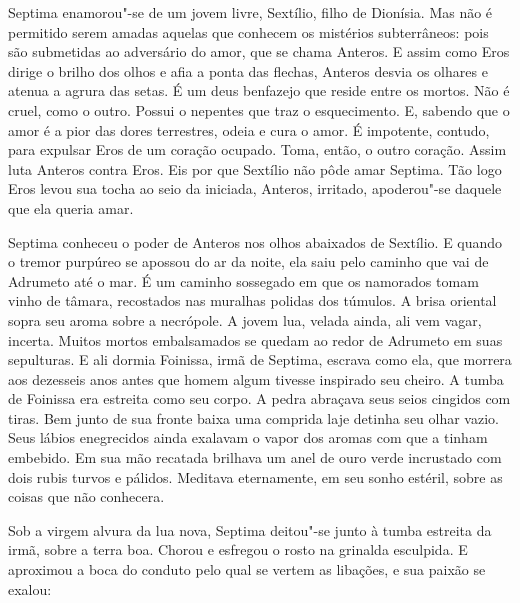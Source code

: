 Septima enamorou"-se de um jovem livre, Sextílio, filho de Dionísia. Mas não
é permitido serem amadas aquelas que conhecem os mistérios subterrâneos:
pois são submetidas ao adversário do amor, que se chama Anteros. E assim
como Eros dirige o brilho dos olhos e afia a ponta das flechas, Anteros
desvia os olhares e atenua a agrura das setas. É um deus benfazejo que
reside entre os mortos. Não é cruel, como o outro. Possui o nepentes que
traz o esquecimento. E, sabendo que o amor é a pior das dores terrestres,
odeia e cura o amor. É impotente, contudo, para expulsar Eros de um
coração ocupado. Toma, então, o outro coração. Assim luta Anteros contra
Eros. Eis por que Sextílio não pôde amar Septima. Tão logo Eros levou sua
tocha ao seio da iniciada, Anteros, irritado, apoderou"-se daquele que ela
queria amar.

Septima conheceu o poder de Anteros nos olhos abaixados de Sextílio. E
quando o tremor purpúreo se apossou do ar da noite, ela saiu pelo caminho
que vai de Adrumeto até o mar. É um caminho sossegado em que os namorados
tomam vinho de tâmara, recostados nas muralhas polidas dos túmulos. A
brisa oriental sopra seu aroma sobre a necrópole. A jovem lua, velada
ainda, ali vem vagar, incerta. Muitos mortos embalsamados se quedam ao
redor de Adrumeto em suas sepulturas. E ali dormia Foinissa, irmã de
Septima, escrava como ela, que morrera aos dezesseis anos antes que homem
algum tivesse inspirado seu cheiro. A tumba de Foinissa era estreita como
seu corpo. A pedra abraçava seus seios cingidos com tiras. Bem junto de
sua fronte baixa uma comprida laje detinha seu olhar vazio. Seus lábios
enegrecidos ainda exalavam o vapor dos aromas com que a tinham embebido.
Em sua mão recatada brilhava um anel de ouro verde incrustado com dois
rubis turvos e pálidos. Meditava eternamente, em seu sonho estéril, sobre
as coisas que não conhecera.

Sob a virgem alvura da lua nova, Septima deitou"-se junto à tumba estreita
da irmã, sobre a terra boa. Chorou e esfregou o rosto na grinalda
esculpida. E aproximou a boca do conduto pelo qual se vertem as libações,
e sua paixão se exalou:

